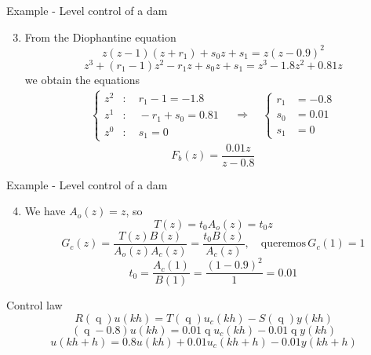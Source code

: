 \documentclass[presentation,aspectratio=169]{beamer}
\DeclareMathOperator{\shift}{q}
\begin{document}
\begin{frame}[label={sec:orgc75df91}]{Example - Level control of a dam}
\begin{enumerate}
\setcounter{enumi}{2}
\item From the Diophantine equation \[ z(z-1)(z+r_1) + s_0z + s_1 = z(z-0.9)^2\]
\[ z^3 + (r_1-1)z^2 - r_1z + s_0z + s_1 = z^3 -1.8z^2 + 0.81z\]
we obtain the equations
\begin{align*}
\begin{cases} z^2 &: \quad r_1-1 = -1.8\\
z^1 &: \quad -r_1 + s_0 = 0.81\\
z^0 &: \quad s_1 = 0
\end{cases}
\quad \Rightarrow \quad 
\begin{cases} r_1 &= -0.8\\ s_0 &= 0.01\\ s_1 &=0 \end{cases}
\end{align*}
\[F_b(z) = \frac{0.01z}{z - 0.8}\]
\end{enumerate}
\end{frame}

\begin{frame}[label={sec:org2dcdae7}]{Example - Level control of a dam}
\begin{enumerate}
\setcounter{enumi}{3}
\item We have \(A_o(z) = z\), so 
\[T(z) = t_0A_o(z) = t_0z\]
\[G_c(z) = \frac{T(z)B(z)}{A_o(z)A_c(z)} = \frac{t_0 B(z)}{A_c(z)}, \quad \text{queremos}\, G_c(1)=1\]
\[ t_0 = \frac{A_c(1)}{B(1)} = \frac{(1-0.9)^2}{1} = 0.01\]
\end{enumerate}

\alert{Control law}
\[R(\shift) u(kh) = T(\shift)u_c(kh) - S(\shift)y(kh)\]
\[ (\shift - 0.8)u(kh) = 0.01\shift u_c(kh) - 0.01\shift y(kh)\]
\[ u(kh+h) = 0.8u(kh) + 0.01 u_c(kh+h) - 0.01y(kh+h)\]
\end{frame}
\end{document}
